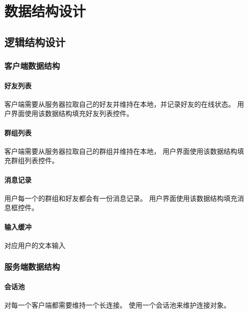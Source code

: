\chapter{数据结构设计}
\section{逻辑结构设计}

\subsection{客户端数据结构}

\subsubsection{好友列表}
客户端需要从服务器拉取自己的好友并维持在本地，并记录好友的在线状态。
用户界面使用该数据结构填充好友列表控件。

\subsubsection{群组列表}
客户端需要从服务器拉取自己的群组并维持在本地，
用户界面使用该数据结构填充群组列表控件。

\subsubsection{消息记录}
用户每一个的群组和好友都会有一份消息记录。
用户界面使用该数据结构填充消息框控件。

\subsubsection{输入缓冲}
对应用户的文本输入

\subsection{服务端数据结构}

\subsubsection{会话池}
对每一个客户端都需要维持一个长连接。
使用一个会话池来维护连接对象。

